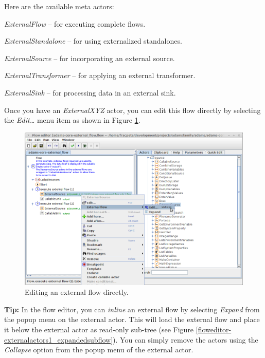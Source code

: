 Here are the available meta actors:
\begin{tight_itemize}
	\item \textit{ExternalFlow} -- for executing complete flows.
	\item \textit{ExternalStandalone} -- for using externalized standalones.
	\item \textit{ExternalSource} -- for incorporating an external source.
	\item \textit{ExternalTransformer} -- for applying an external transformer.
	\item \textit{ExternalSink} -- for processing data in an external sink.
\end{tight_itemize}

Once you have an \textit{ExternalXYZ} actor, you can edit this flow directly by 
selecting the \textit{Edit\ldots} menu item as shown in Figure 
\ref{floweditor-externalactors1_editsubflow}.
\begin{figure}[htb]
  \centering
  \includegraphics[width=12.0cm]{images/floweditor-externalactors1_editsubflow.png}
  \caption{Editing an external flow directly.}
  \label{floweditor-externalactors1_editsubflow}
\end{figure}

\textbf{Tip:} In the flow editor, you can \textit{inline} an external flow by
selecting \textit{Expand} from the popup menu on the external
actor. This will load the external flow and place it below the external actor
as read-only sub-tree (see Figure \ref{floweditor-externalactors1_expandedsubflow}). You can simply remove the actors using the
\textit{Collapse} option from the popup menu of the external actor.

